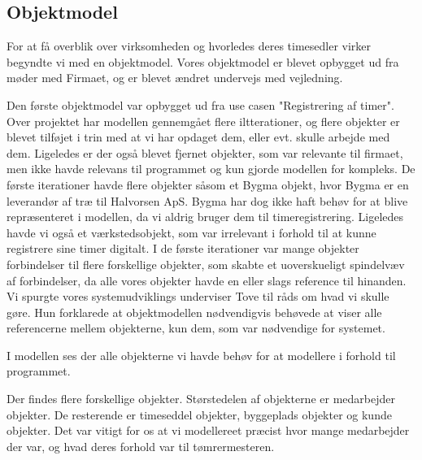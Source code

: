 \subsection{Objektmodel}

For at få overblik over virksomheden og hvorledes deres timesedler virker begyndte vi med en objektmodel. Vores objektmodel er blevet opbygget ud fra møder med Firmaet, og er blevet ændret undervejs med vejledning.

Den første objektmodel var opbygget ud fra use casen "Registrering af timer". Over projektet har modellen gennemgået flere iltterationer, og flere objekter er blevet tilføjet i trin med at vi har opdaget dem, eller evt. skulle arbejde med dem. Ligeledes er der også blevet fjernet objekter, som var relevante til firmaet, men ikke havde relevans til programmet og kun gjorde modellen for kompleks. De første iterationer havde flere objekter såsom et Bygma objekt, hvor Bygma er en leverandør af træ til Halvorsen ApS. Bygma har dog ikke haft behøv for at blive repræsenteret i modellen, da vi aldrig bruger dem til timeregistrering. Ligeledes havde vi også et værkstedsobjekt, som var irrelevant i forhold til at kunne registrere sine timer digitalt. I de første iterationer var mange objekter forbindelser til flere forskellige objekter, som skabte et uoverskueligt spindelvæv af forbindelser, da alle vores objekter havde en eller slags reference til hinanden. Vi spurgte vores systemudviklings underviser Tove til råds om hvad vi skulle gøre. Hun forklarede at objektmodellen nødvendigvis behøvede at viser alle referencerne mellem objekterne, kun dem, som var nødvendige for systemet.

I modellen ses der alle objekterne vi havde behøv for at modellere i forhold til programmet.



Der findes flere forskellige objekter. Størstedelen af objekterne er medarbejder objekter. De resterende er timeseddel objekter, byggeplads objekter og kunde objekter. Det var vitigt for os at vi modellereet præcist hvor mange medarbejder der var, og hvad deres forhold var til tømrermesteren.